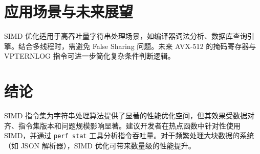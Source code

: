 \chapter{应用场景与未来展望}
SIMD 优化适用于高吞吐量字符串处理场景，如编译器词法分析、数据库查询引擎。结合多线程时，需避免 False Sharing 问题。未来 AVX-512 的掩码寄存器与 VPTERNLOG 指令可进一步简化复杂条件判断逻辑。\par
\chapter{结论}
SIMD 指令集为字符串处理算法提供了显著的性能优化空间，但其效果受数据对齐、指令集版本和问题规模影响显著。建议开发者在热点函数中针对性使用 SIMD，并通过 \verb!perf stat! 工具分析指令吞吐量。对于频繁处理大块数据的系统（如 JSON 解析器），SIMD 优化可带来数量级的性能提升。\par
